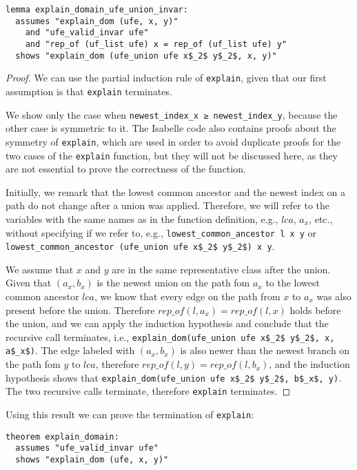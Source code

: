 \begin{lstlisting}
lemma explain_domain_ufe_union_invar:
  assumes "explain_dom (ufe, x, y)"
    and "ufe_valid_invar ufe"
    and "rep_of (uf_list ufe) x = rep_of (uf_list ufe) y"
  shows "explain_dom (ufe_union ufe x$_2$ y$_2$, x, y)"
\end{lstlisting}

\begin{proof}
We can use the partial induction rule of \lstinline|explain|, given that our first assumption is that \lstinline|explain| terminates.

We show only the case when \lstinline|newest_index_x ≥ newest_index_y|, because the other case is symmetric to it. The Isabelle code also contains proofs about the symmetry of \lstinline{explain}, which are used in order to avoid duplicate proofs for the two cases of the \lstinline{explain} function, but they will not be discussed here, as they are not essential to prove the correctness of the function.

Initially, we remark that the lowest common ancestor and the newest index on a path do not change after a union was applied. Therefore, we will refer to the variables with the same names as in the function definition, e.g., $lca$, $a_x$, etc., without specifying if we refer to, e.g., \lstinline|lowest_common_ancestor l x y| or \lstinline|lowest_common_ancestor (ufe_union ufe x$_2$ y$_2$) x y|.

We assume that $x$ and $y$ are in the same representative class after the union.
Given that $(a_x, b_x)$ is the newest union on the path fom $a_x$ to the lowest common ancestor $lca$, we know that every edge on the path from $x$ to $a_x$ was also present before the union. Therefore $rep\_of(l, a_x) = rep\_of(l, x)$ holds before the union, and we can apply the induction hypothesis and conclude that the recursive call terminates, i.e., \lstinline|explain_dom(ufe_union ufe x$_2$ y$_2$, x, a$_x$)|. The edge labeled with $(a_x, b_x)$ is also newer than the newest branch on the path fom $y$ to $lca$, therefore $rep\_of(l, y) = rep\_of(l, b_x)$, and the induction hypothesis shows that \lstinline|explain_dom(ufe_union ufe x$_2$ y$_2$, b$_x$, y)|. The two recursive calls terminate, therefore \lstinline|explain| terminates.
\end{proof}

Using this result we can prove the termination of \lstinline|explain|:

\begin{lstlisting}
theorem explain_domain:
  assumes "ufe_valid_invar ufe"
  shows "explain_dom (ufe, x, y)"
\end{lstlisting}

